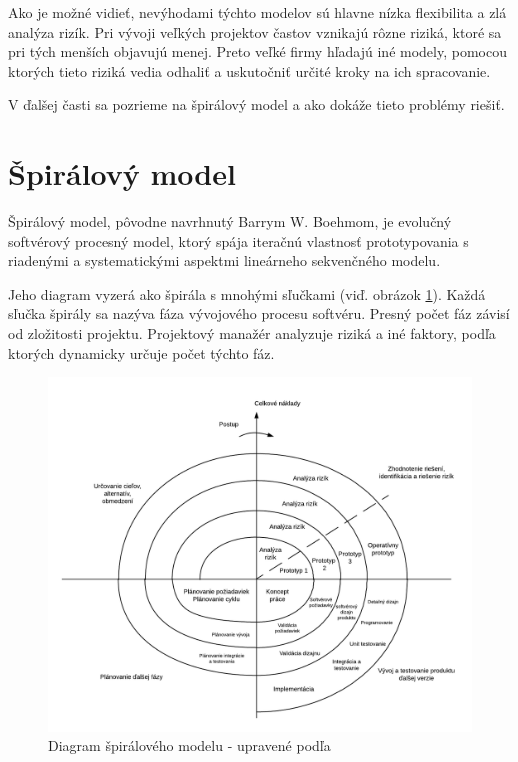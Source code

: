 \documentclass[10pt,twoside,slovak,a4paper]{article}
\begin{document}
Ako je možné vidieť, nevýhodami týchto modelov sú hlavne nízka flexibilita a zlá analýza rizík. Pri vývoji veľkých projektov častov vznikajú rôzne riziká, ktoré sa pri tých menších objavujú menej. Preto veľké firmy hľadajú iné modely, pomocou ktorých tieto riziká vedia odhaliť a uskutočniť určité kroky na ich spracovanie.

V ďalšej časti sa pozrieme na špirálový model a ako dokáže tieto problémy riešiť.

\pagebreak

\section{Špirálový model} \label{spiralModel}
Špirálový model, pôvodne navrhnutý Barrym W. Boehmom, je evolučný softvérový procesný model, ktorý spája iteračnú vlastnosť prototypovania s riadenými a systematickými aspektmi lineárneho sekvenčného modelu. \cite{SpiralModelDef}

Jeho diagram vyzerá ako špirála s mnohými sľučkami (viď. obrázok \ref{spiralDiagram}). Každá sľučka špirály sa nazýva fáza vývojového procesu softvéru. Presný počet fáz závisí od zložitosti projektu. Projektový manažér analyzuje riziká a iné faktory, podľa ktorých dynamicky určuje počet týchto fáz.

\begin{figure}[h]
\includegraphics[width=\textwidth]{spiralModel.png}
\caption{Diagram špirálového modelu - upravené podľa \cite{Boehm}} 
\label{spiralDiagram}
\end{figure} 
\end{document}
